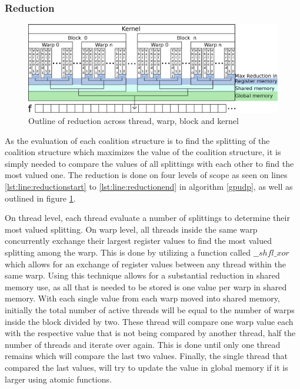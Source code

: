 \documentclass{llncs}
\begin{document}
\subsubsection{Reduction} \label{reduction} %
\begin{figure}
\centering
\includegraphics[width=\linewidth]{reduction}
\caption{Outline of reduction across thread, warp, block and kernel \label{fig:reduction}}
\end{figure}

As the evaluation of each coalition structure is to find the splitting 
of the coalition structure which maximizes the value of the coalition structure,
it is simply needed to compare the values of all splittings with each other to find the most valued one. 
The reduction is done on four levels of scope as seen on lines \ref{lst:line:reductionstart} to \ref{lst:line:reductionend} in algorithm \ref{gpudp},
as well as outlined in figure \ref{fig:reduction}.

On thread level, each thread evaluate a number of splittings to determine their most valued splitting. 
On warp level, all threads inside the same warp concurrently exchange their largest register values to find the most valued splitting among the warp.
This is done by utilizing a function called $\_\_shfl\_xor$ which allows for an exchange of register values between any thread within the same warp.
Using this technique allows for a substantial reduction in shared memory use, as all that is needed to be stored is one value per warp in shared memory. 
With each single value from each warp moved into shared memory, initially the total number of active threads will be equal to the number
of warps inside the block divided by two. These thread will compare one warp value each with the respective value that is not being compared by
another thread, half the number of threads and iterate over again. This is done until only one thread remains which will compare the last two values.
Finally, the single thread that compared the last values, will try to update the value in global memory if it is larger using atomic functions.
\end{document}
